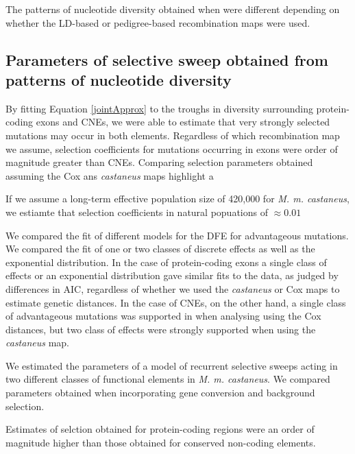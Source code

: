 \documentclass[11pt]{article}
\begin{document}
		The patterns of nucleotide diversity obtained when were different depending on whether the LD-based or pedigree-based recombination maps were used. 
	
\subsection*{Parameters of selective sweep obtained from patterns of nucleotide diversity}

	By fitting Equation \ref{jointApprox} to the troughs in diversity surrounding protein-coding exons and CNEs, we were able to estimate that very strongly selected mutations may occur in both elements. Regardless of which recombination map we assume, selection coefficients for mutations occurring in exons were order of magnitude greater than CNEs. Comparing selection parameters obtained assuming the Cox ans \textit{castaneus} maps highlight a 
	
	If we assume a long-term effective population size of 420,000 for \textit{M. m. castaneus}, we estiamte that selection coefficients in natural popuations of $\approx 0.01$

	We compared the fit of different models for the DFE for advantageous mutations. We compared the fit of one or two classes of discrete effects as well as the exponential distribution. In the case of protein-coding exons a single class of effects or an exponential distribution gave similar fits to the data, as judged by differences in AIC, regardless of whether we used the \textit{castaneus} or Cox maps to estimate genetic distances. In the case of CNEs, on the other hand, a single class of advantageous mutations was supported in when analysing using the Cox distances, but two class of effects were strongly supported when using the \textit{castaneus} map. 

	We estimated the parameters of a model of recurrent selective sweeps acting in two different classes of functional elements in \textit{M. m. castaneus}. We compared parameters obtained when incorporating gene conversion and background selection.
	


Estimates of selction obtained for protein-coding regions were an order of magnitude higher than those obtained for conserved non-coding elements. 
\end{document}
